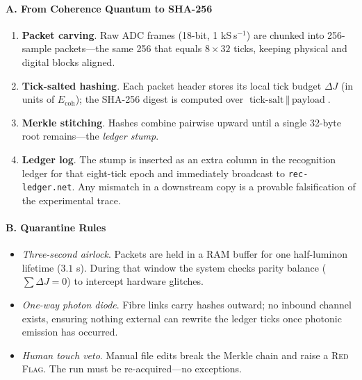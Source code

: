 \documentclass[11pt,oneside]{book}
\begin{document}
{\paragraph{A. From Coherence Quantum to SHA-256}

\begin{enumerate}[label=\textbf{\arabic*.}, leftmargin=1.25cm]
\item \textbf{Packet carving}.  
      Raw ADC frames (18-bit, 1 kS s\(^{-1}\)) are chunked into
      256-sample packets—the same 256 that equals
      \(8\times32\) ticks, keeping physical and digital blocks aligned.
\item \textbf{Tick-salted hashing}.  
      Each packet header stores its local tick budget
      $\Delta J$ (in units of $E_{\text{coh}}$);  
      the SHA-256 digest is computed over
      \(\text{tick-salt}\,\|\,\text{payload}\).
\item \textbf{Merkle stitching}.  
      Hashes combine pairwise upward until a single 32-byte root
      remains—the \emph{ledger stump}.
\item \textbf{Ledger log}.  
      The stump is inserted as an extra column in the recognition ledger
      for that eight-tick epoch and immediately broadcast to
      \texttt{rec-ledger.net}.  Any mismatch in a downstream copy is a
      provable falsification of the experimental trace.
\end{enumerate}

\paragraph{B. Quarantine Rules}

\begin{itemize}
\item \textit{Three-second airlock}.  
      Packets are held in a RAM buffer for one half-luminon lifetime
      ($3.1$ s).  
      During that window the system checks parity balance
      ($\sum \Delta J = 0$) to intercept hardware glitches.
\item \textit{One-way photon diode}.  
      Fibre links carry hashes outward; no inbound channel exists,
      ensuring nothing external can rewrite the ledger ticks once
      photonic emission has occurred.
\item \textit{Human touch veto}.  
      Manual file edits break the Merkle chain and raise a
      \textsc{Red Flag}.  The run must be re-acquired—no exceptions.
\end{itemize}

}
\end{document}
